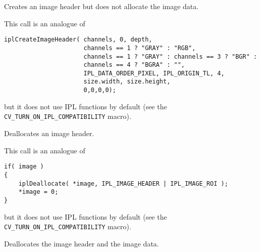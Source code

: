 \label{CreateImageHeader}

Creates an image header but does not allocate the image data.


\begin{description}
\end{description}

This call is an analogue of

\begin{lstlisting}
iplCreateImageHeader( channels, 0, depth,
                      channels == 1 ? "GRAY" : "RGB",
                      channels == 1 ? "GRAY" : channels == 3 ? "BGR" :
                      channels == 4 ? "BGRA" : "",
                      IPL_DATA_ORDER_PIXEL, IPL_ORIGIN_TL, 4,
                      size.width, size.height,
                      0,0,0,0);
\end{lstlisting}

but it does not use IPL functions by default (see the \texttt{CV\_TURN\_ON\_IPL\_COMPATIBILITY} macro).

\label{ReleaseImageHeader}

Deallocates an image header.


\begin{description}
\end{description}

This call is an analogue of

\begin{lstlisting}
if( image )
{
    iplDeallocate( *image, IPL_IMAGE_HEADER | IPL_IMAGE_ROI );
    *image = 0;
}
\end{lstlisting}

but it does not use IPL functions by default (see the \texttt{CV\_TURN\_ON\_IPL\_COMPATIBILITY} macro).


\label{ReleaseImage}

Deallocates the image header and the image data.


